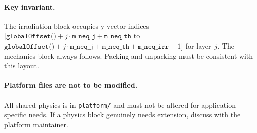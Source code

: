 \documentclass[11pt,a4paper]{article}
\begin{document}
\paragraph{Key invariant.}
The irradiation block occupies y-vector indices $[\texttt{globalOffset()} + j \cdot \texttt{m\_neq\_j} + \texttt{m\_neq\_th}$ to $\texttt{globalOffset()} + j \cdot \texttt{m\_neq\_j} + \texttt{m\_neq\_th} + \texttt{m\_neq\_irr} - 1]$ for layer~$j$.  The mechanics block always follows.  Packing and unpacking must be consistent with this layout.

\paragraph{Platform files are not to be modified.}
All shared physics is in \texttt{platform/} and must not be altered for application-specific needs.  If a physics block genuinely needs extension, discuss with the platform maintainer.
\end{document}
